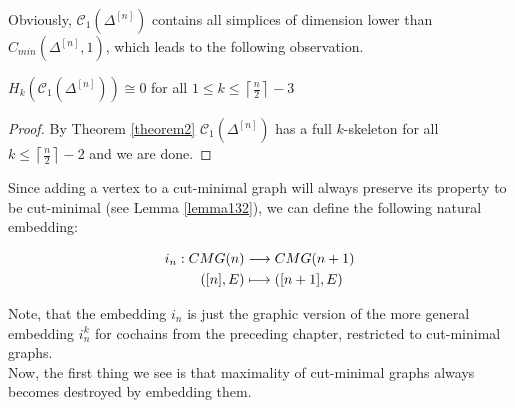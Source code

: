 Obviously, \(\mathcal{C}_1(\Delta^{[n]})\) contains all simplices of dimension lower than \(C_{min}(\Delta^{[n]},1)\), which leads to the following observation.

\begin{cor}
\(H_k(\mathcal{C}_1(\Delta^{[n]}))\cong 0\) for all \(1\leq k\leq\left\lceil\frac{n}{2}\right\rceil-3\)
\begin{proof}
By Theorem \ref{theorem2} \(\mathcal{C}_1(\Delta^{[n]})\) has a full \(k\)-skeleton for all \(k\leq\left\lceil\frac{n}{2}\right\rceil-2\) and we are done. 
\end{proof}
\end{cor}

Since adding a vertex to a cut-minimal graph will always preserve its property to be cut-minimal (see Lemma \ref{lemma132}), we can define the following natural embedding:

\begin{align}
i_n:CMG(n)&\longrightarrow CMG(n+1)\notag \\
([n],E)&\longmapsto ([n+1],E)\notag
\end{align}

Note, that the embedding \(i_n\) is just the graphic version of the more general embedding \(i_n^k\) for cochains from the preceding chapter, restricted to cut-minimal graphs.\\
Now, the first thing we see is that maximality of cut-minimal graphs always becomes destroyed by embedding them.

